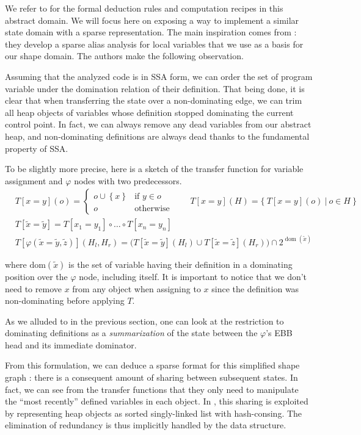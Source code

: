 \documentclass[11pt]{article}
\renewcommand{\phi}{\varphi}
\DeclareMathOperator{\dom}{dom}
\begin{document}
We refer to \cite{ssc} for the formal deduction rules and computation recipes in this abstract domain.
We will focus here on exposing a way to implement a similar state domain with a sparse representation.
The main inspiration comes from \cite{ssa-alias}: they develop a sparse alias analysis for local variables that we use as a basis for our shape domain. The authors make the following observation.

Assuming that the analyzed code is in SSA form, we can order the set of program variable under the domination relation of their definition.
That being done, it is clear that when transferring the state over a non-dominating edge, we can trim all heap objects of variables whose definition stopped dominating the current control point. In fact, we can always remove any dead variables from our abstract heap, and non-dominating definitions are always dead thanks to the fundamental property of SSA.

To be slightly more precise, here is a sketch of the transfer function for variable assignment and $\phi$ nodes with two predecessors.
\[
\begin{aligned}
&T[x=y](o) = \begin{cases}
o \cup \left\{ x \right\} & \text{if } y \in o \\
o & \text{otherwise}
\end{cases}
\qquad
T[x=y](H) = \Big\{~T[x=y](o)~|~o \in H~\Big\} \\
& T[\tilde{x}=\tilde{y}] = T[x_1=y_1]\circ\dots\circ T[x_n=y_n] \\
&T[\phi(\tilde{x}=\tilde{y},\tilde{z})](H_l,H_r) = \big( T[\tilde{x}=\tilde{y}](H_l)\cup T[\tilde{x}=\tilde{z}](H_r) \big)\cap 2^{\dom(\tilde{x})}
\end{aligned}
\]

where $\text{dom}(\tilde{x})$ is the set of variable having their definition in a dominating position over the $\phi$ node, including itself. It is important to notice that we don't need to remove $x$ from any object when assigning to $x$ since the definition was non-dominating before applying $T$.

As we alluded to in the previous section, one can look at the restriction to dominating definitions as a \emph{summarization} of the state between the $\phi$'s EBB head and its immediate dominator.

From this formulation, we can deduce a sparse format for this simplified shape graph : there is a consequent amount of sharing between subsequent states. In fact, we can see from the transfer functions that they only need to manipulate the ``most recently'' defined variables in each object.
In \cite{ssa-alias}, this sharing is exploited by representing heap objects as sorted singly-linked list with hash-consing. The elimination of redundancy is thus implicitly handled by the data structure.
\end{document}
